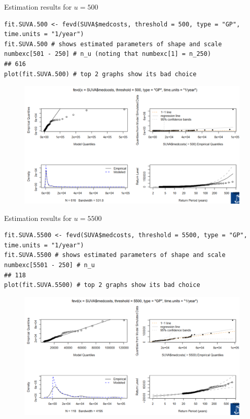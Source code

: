 \documentclass[11pt]{article}
\newcommand{\noi}{\noindent}
\begin{document}
\noi Estimation results for $u=500$
\begin{lstlisting}
fit.SUVA.500 <- fevd(SUVA$medcosts, threshold = 500, type = "GP",
time.units = "1/year")
fit.SUVA.500 # shows estimated parameters of shape and scale
numbexc[501 - 250] # n_u (noting that numbexc[1] = n_250)
## 616
plot(fit.SUVA.500) # top 2 graphs show its bad choice
\end{lstlisting}
\begin{figure}[H]
    \centering
    \includegraphics[width=0.7\linewidth]{GPD - example - u500.png}
\end{figure}

\noi Estimation results for $u=5500$
\begin{lstlisting}
fit.SUVA.5500 <- fevd(SUVA$medcosts, threshold = 5500, type = "GP",
time.units = "1/year")
fit.SUVA.5500 # shows estimated parameters of shape and scale
numbexc[5501 - 250] # n_u
## 118
plot(fit.SUVA.5500) # top 2 graphs show its bad choice
\end{lstlisting}
\begin{figure}[H]
    \centering
    \includegraphics[width=0.7\linewidth]{GPD - example - u5500.png}
\end{figure}
\end{document}
